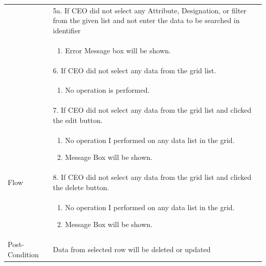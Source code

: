 \documentclass[12pt,a4paper]{article}
\begin{document}
\begin{longtable}{| p{3cm}|p{12cm}|}
& 5a. If CEO did not select any Attribute, Designation, or filter from the given list and not enter the data to be searched in identifier \\
& \begin{enumerate}
		\item Error Message box will be shown.
	\end{enumerate}
\\  
& 6. If CEO did not select any data from the grid list.  \\
& \begin{enumerate}
		\item No operation is performed.
	\end{enumerate}
\\ \hline  
& 7. If CEO did not select any data from the grid list and clicked the edit button.\\
& \begin{enumerate}
		\item No operation I performed on any data list in the grid.
            \item Message Box will be shown.
	\end{enumerate}
\\
Flow       & 8. If CEO did not select any data from the grid list and clicked the delete button.\\
 	&\begin{enumerate}
			\item No operation I performed on any data list in the grid.
            \item Message Box will be shown.
	\end{enumerate}
\\ \hline 


Post-Condition &  Data from selected row will be deleted or updated  \\ \hline

\end{longtable}
\end{document}
